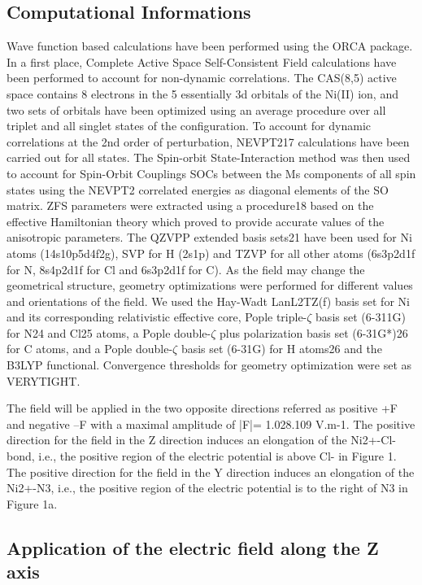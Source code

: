 \documentclass[10pt]{report}
\numberwithin{equation}{section}
\begin{document}
\subsection{Computational Informations}
Wave function based calculations have been performed using the ORCA package.
In a first place, Complete Active Space Self-Consistent Field calculations have been performed to account for non-dynamic correlations. 
The CAS(8,5) active space contains 8 electrons in the 5 essentially 3d orbitals of the Ni(II) ion, and two sets of orbitals have been optimized using an average procedure over all triplet and all singlet states of the configuration.
To account for dynamic correlations at the 2nd order of perturbation, NEVPT217 calculations have been carried out for all states. 
The Spin-orbit State-Interaction method was then used to account for Spin-Orbit Couplings SOCs between the Ms components of all spin states using the NEVPT2 correlated energies as diagonal elements of the SO matrix. 
ZFS parameters were extracted using a procedure18 based on the effective Hamiltonian theory which proved to provide accurate values of the anisotropic parameters. 
The QZVPP extended basis sets21 have been used for Ni atoms (14s10p5d4f2g), SVP for H (2s1p) and TZVP for all other atoms (6s3p2d1f for N, 8s4p2d1f for Cl and 6s3p2d1f for C). 
As the field may change the geometrical structure, geometry optimizations were performed for different values and orientations of the field. 
We used the Hay-Wadt LanL2TZ(f) basis set for Ni and its corresponding relativistic effective core, Pople triple-$\zeta$ basis set (6-311G) for N24 and Cl25 atoms, a Pople double-$\zeta$ plus polarization basis set (6-31G*)26 for C atoms, and a Pople double-$\zeta$ basis set (6-31G) for H atoms26 and the B3LYP functional.
Convergence thresholds for geometry optimization were set as VERYTIGHT.

The field will be applied in the two opposite directions referred as positive +F and negative –F with a maximal amplitude of |F|= 1.028.109 V.m-1.
The positive direction for the field in the Z direction induces an elongation of the Ni2+-Cl- bond, i.e., the positive region of the electric potential is above Cl- in Figure 1. 
The positive direction for the field in the Y direction induces an elongation of the Ni2+-N3, i.e., the positive region of the electric potential is to the right of N3 in Figure 1a.

\subsection{Application of the electric field along the Z axis}
\end{document}
